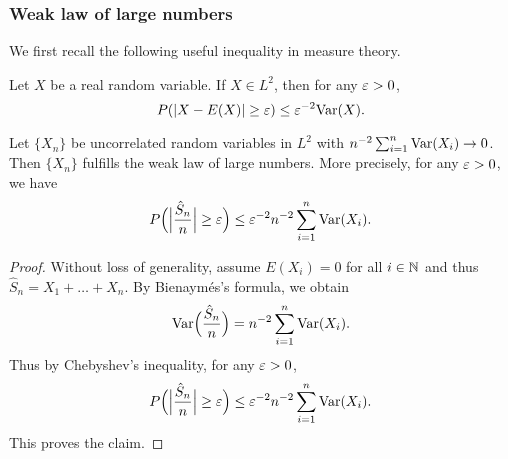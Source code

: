 \subsubsection{Weak law of large numbers}
We first recall the following useful inequality in measure theory.
\begin{proposition}
Let $X$ be a real random variable. If $X\in L^2$, then for any $\varepsilon>0$,
\[P(|X-E(X)|\geq\varepsilon)\leq\varepsilon^{-2}\mathrm{Var}(X).\]
\end{proposition}
\begin{theorem}
Let $\{X_n\}$ be uncorrelated random variables in $L^2$ with $n^{-2}\sum_{i=1}^{n}\mathrm{Var}(X_i)\to 0$. Then $\{X_n\}$ fulfills the weak law of large numbers. More precisely, for any $\varepsilon>0$, we have
\[P\Big(\Big|\frac{\hat{S}_n}{n}\Big|\geq\varepsilon\Big)\leq \varepsilon^{-2}n^{-2}\sum_{i=1}^{n}\mathrm{Var}(X_i).\]
\end{theorem}
\begin{proof}
Without loss of generality, assume $E(X_i)=0$ for all $i\in\mathbb{N}$ and thus $\hat{S}_n=X_1+\dots+X_n$. By Bienaym\'es's formula, we obtain
\[\mathrm{Var}\Big(\frac{\hat{S}_n}{n}\Big)=n^{-2}\sum_{i=1}^{n}\mathrm{Var}(X_i).\]
Thus by Chebyshev's inequality, for any $\varepsilon>0$,
\begin{align*}
P\Big(\Big|\frac{\hat{S}_n}{n}\Big|\geq\varepsilon\Big)\leq\varepsilon^{-2}n^{-2}\sum_{i=1}^{n}\mathrm{Var}(X_i).
\end{align*}
This proves the claim.
\end{proof}
